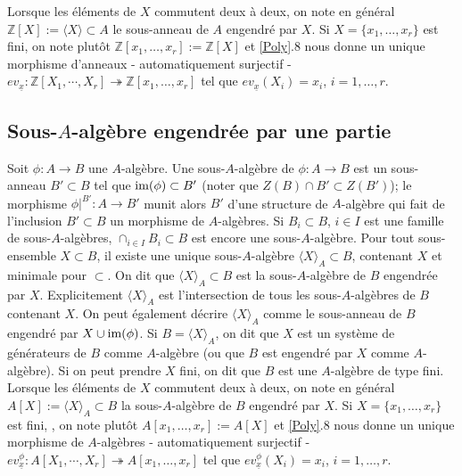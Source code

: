 \documentclass[a4paper, 12pt]{amsart}
\newcommand{\Z}{\mathbb{Z}}
\begin{document}
 Lorsque les éléments de $X$ commutent deux à deux, on note en général $\Z[X]:=\langle X\rangle \subset A$ le sous-anneau de $A$ engendré par $X$. Si  $X=\lbrace x_1,\dots,x_r\rbrace $ est fini, on note plutôt $\Z[x_1,\dots,x_r]:=\Z[X]$ et \ref{Poly}.8  nous donne un unique morphisme d'anneaux - automatiquement  surjectif - $ev_{\underline{x}}:\Z[X_1,\cdots, X_r]\twoheadrightarrow \Z[x_1,\dots,x_r] $ tel que $ev_{\underline{x}}(X_i)=x_i$, $i=1,\dots, r$.   \\
 
  \subsection{Sous-$A$-algèbre engendrée par une partie}\label{SousAlg} Soit $\phi:A\rightarrow B$ une $A$-algèbre. Une sous-$A$-algèbre de $\phi:A\rightarrow B$ est un sous-anneau $B'\subset B$ tel que $\hbox{\rm im}(\phi)\subset B'$ (noter que $Z(B)\cap B'\subset Z(B')$); le morphisme $\phi|^{B'}:A\rightarrow B'$ munit alors $B'$ d'une structure de $A$-algèbre qui fait de l'inclusion $B'\subset B$ un morphisme de $A$-algèbres. Si    $B_i\subset B$, $i\in I$ est une famille de sous-$A$-algèbres, $\cap_{i\in I}B_i\subset B$  est encore une sous-$A$-algèbre. Pour tout sous-ensemble $X\subset B$, il existe 
une unique sous-$A$-algèbre $\langle X\rangle_A \subset B$, contenant $X$ et minimale pour $\subset$. On dit que $\langle X\rangle_A\subset B$ est la sous-$A$-algèbre de $B$ engendrée par $X$. Explicitement $\langle X\rangle_A$ est l'intersection de tous les sous-$A$-algèbres de $B$ contenant $X$. On peut également décrire $\langle X\rangle_A$ comme  le sous-anneau de $B$ engendré par $X\cup\hbox{\rm im}(\phi)$. Si $B=\langle X\rangle_A$, on dit que $X$ est un système de générateurs de $B$ comme $A$-algèbre (ou que $B$ est engendré par $X$ comme $A$-algèbre). Si on peut prendre $X$ fini, on dit que $B$ est une $A$-algèbre de type fini.\\

 Lorsque les éléments de $X$ commutent deux à deux, on note en général $A[X]:=\langle X\rangle_A \subset B$ la sous-$A$-algèbre de $B$ engendré par $X$. Si  $X=\lbrace x_1,\dots,x_r\rbrace $ est fini, , on note plutôt $A[x_1,\dots,x_r]:=A[X]$ et  \ref{Poly}.8  nous donne un unique morphisme de $A$-algèbres - automatiquement  surjectif - $ev_{\underline{x}}^\phi:A[X_1,\cdots, X_r]\twoheadrightarrow A[x_1,\dots, x_r] $ tel que $ev^\phi_{\underline{x}}(X_i)=x_i$, $i=1,\dots, r$. \\
\end{document}
